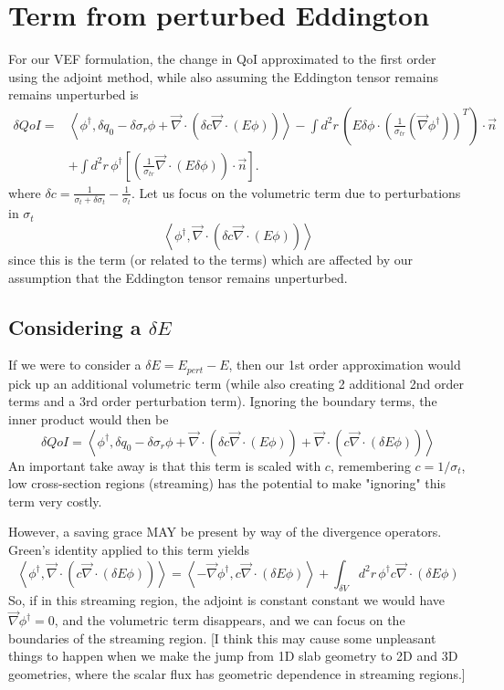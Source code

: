 \documentclass{article}
\newcommand{\bra}{\left\langle}
\newcommand{\ket}{\right\rangle}
\newcommand{\vdiv}{\vec{\nabla} \cdot}
\newcommand{\vgrad}{\vec{\nabla}}
\begin{document}
\section{Term from perturbed Eddington}
For our VEF formulation, the change in QoI approximated to the first order using the adjoint method, while also assuming the Eddington tensor remains remains unperturbed is 
\begin{align*}
\delta QoI =& \bra \phi^\dag , \delta q_0 - \delta \sigma_r \phi + \vdiv \left( \delta c \vdiv \left( E \phi \right) \right)  \ket - \int d^2 r \, \left( E \delta \phi \cdot \left( \frac{1}{ \sigma_{tr}} \left(  \vgrad \phi^\dag \right) \right)^T \right) \cdot \vec{n} \\
&+ \int d^2 r \, \phi^\dag \left[ \left( \frac{1}{\sigma_{tr}} \vdiv \left( E \delta \phi \right) \right) \cdot \vec{n} \right].
\end{align*}
where $\delta c = \frac{1}{\sigma_t + \delta \sigma_t} -  \frac{1}{\sigma_t}$.
Let us focus on the volumetric term due to perturbations in $\sigma_t$
\[
\bra \phi^\dag ,  \vdiv \left( \delta c \vdiv \left( E \phi \right) \right)  \ket
\]
since this is the term (or related to the terms) which are affected by our assumption that the Eddington tensor remains unperturbed.

\subsection{Considering a $\delta E$}
If we were to consider a $\delta E = E_{pert} - E$, then our 1st order approximation would pick up an additional volumetric term (while also creating 2 additional 2nd order terms and a 3rd order perturbation term). Ignoring the boundary terms, the inner product would then be
\[
\delta QoI = \bra \phi^\dag , \delta q_0 - \delta \sigma_r \phi + \vdiv \left( \delta c \vdiv \left( E \phi \right) \right) + \vdiv \left( c \vdiv \left( \delta E \phi \right) \right)  \ket
\]
An important take away is that this term is scaled with $c$, remembering $c=1/\sigma_t$, low cross-section regions (streaming) has the potential to make "ignoring" this term very costly.

However, a saving grace MAY be present by way of the divergence operators. Green's identity applied to this term yields
\[
\bra \phi^\dag , \vdiv \left( c \vdiv \left( \delta E \phi \right) \right)  \ket 
= 
\bra -\vgrad \phi^\dag , c \vdiv \left( \delta E \phi \right)  \ket + \int_{\delta V} d^2 r \, \phi^\dag  c \vdiv \left( \delta E \phi \right)
\]
So, if in this streaming region, the adjoint is constant constant we would have $\vgrad \phi^\dag =0$, and the volumetric term disappears, and we can focus on the boundaries of the streaming region. [I think this may cause some unpleasant things to happen when we make the jump from 1D slab geometry to 2D and 3D geometries, where the scalar flux has geometric dependence in streaming regions.]
\end{document}
